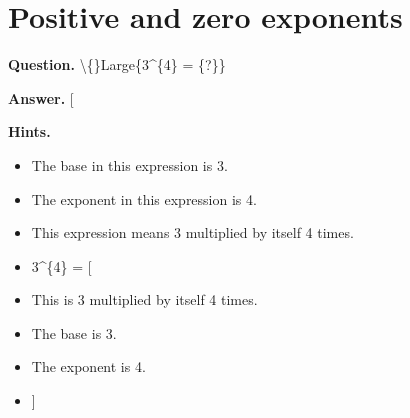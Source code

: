 \documentclass{article}
\begin{document}
\section*{Positive and zero exponents}
\textbf{Question.} \textbackslash\{\}Large\{3\textasciicircum{}\{4\} = \{?\}\}

\textbf{Answer.} [

\textbf{Hints.}
\begin{itemize}
  \item The base in this expression is 3.
  \item The exponent in this expression is 4.
  \item This expression means 3 multiplied by itself 4 times.
  \item 3\textasciicircum{}\{4\} = [
  \item This is 3 multiplied by itself 4 times.
  \item The base is 3.
  \item The exponent is 4.
  \item [ = 3\textasciicircum{}\{4\}
  \item = [[v]]
\end{itemize}
\end{document}
